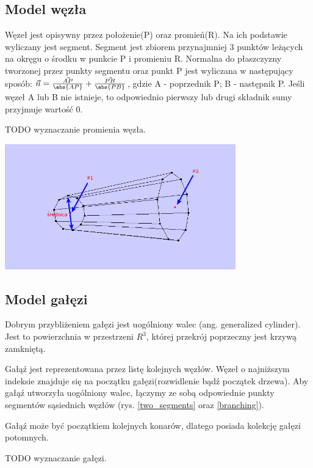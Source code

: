 \subsection{Model węzła}
Węzeł jest opisywny przez położenie(P) oraz promień(R). Na ich podstawie wyliczany jest segment. Segment jest zbiorem przynajmniej 3 punktów leżących na okręgu o środku w punkcie P i promieniu R. Normalna do płaszczyzny tworzonej przez punkty segmentu oraz punkt P jest wyliczana w następujący sposób: $\vec{n}=\frac{\vec{AP}}{\abs{AP}}+\frac{\vec{PB}}{\abs{PB}}$, gdzie A - poprzednik P; B - następnik P. Jeśli węzeł A lub B nie istnieje, to odpowiednio pierwszy lub drugi składnik sumy przyjmuje wartość 0.

TODO wyznaczanie promienia węzła.

\begin{center}
	\includegraphics[width=100mm]{images/model/two_segments.png}
	\label{two_segments}
\end{center}

\subsection{Model gałęzi}
Dobrym przybliżeniem gałęzi jest uogólniony walec (ang. generalized cylinder). Jest to powierzchnia w przestrzeni $R^3$, której przekrój poprzeczny jest krzywą zamkniętą.

Gałąź jest reprezentowana przez listę kolejnych węzłów. Węzeł o najniższym indeksie znajduje się na początku gałęzi(rozwidlenie bądź początek drzewa). Aby gałąź utworzyła uogólniony walec, łączymy ze sobą odpowiednie punkty segmentów sąsiednich węzłów (rys. \ref{two_segments} oraz \ref{branching}).

Gałąź może być początkiem kolejnych konarów, dlatego posiada kolekcję gałęzi potomnych.

TODO wyznaczanie gałęzi.

